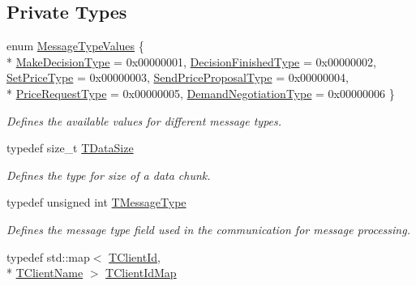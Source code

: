 \subsection*{Private Types}
\begin{DoxyCompactItemize}
\item 
enum \hyperlink{class_control_manager_a7b6de4a130e0de1729c7963edd972120}{Message\-Type\-Values} \{ \\*
\hyperlink{class_control_manager_a7b6de4a130e0de1729c7963edd972120afe62fd2d680bfeddc030a63944f8e513}{Make\-Decision\-Type} = 0x00000001, 
\hyperlink{class_control_manager_a7b6de4a130e0de1729c7963edd972120ae327aef118d20067ec6968987e76580d}{Decision\-Finished\-Type} = 0x00000002, 
\hyperlink{class_control_manager_a7b6de4a130e0de1729c7963edd972120ad0a806bbe260a48560eeeda4ffd855d6}{Set\-Price\-Type} = 0x00000003, 
\hyperlink{class_control_manager_a7b6de4a130e0de1729c7963edd972120ad493a309cdd6a23cc9e78a2e17eaf47d}{Send\-Price\-Proposal\-Type} = 0x00000004, 
\\*
\hyperlink{class_control_manager_a7b6de4a130e0de1729c7963edd972120afad3b5e04ece26c7ec3a5f388db53b43}{Price\-Request\-Type} = 0x00000005, 
\hyperlink{class_control_manager_a7b6de4a130e0de1729c7963edd972120a8adf22182deb49ea93b62097e2618cff}{Demand\-Negotiation\-Type} = 0x00000006
 \}
\begin{DoxyCompactList}\small\item\em Defines the available values for different message types. \end{DoxyCompactList}\item 
typedef size\-\_\-t \hyperlink{class_control_manager_a5c898e9e00806858a59700370560aea7}{T\-Data\-Size}
\begin{DoxyCompactList}\small\item\em Defines the type for size of a data chunk. \end{DoxyCompactList}\item 
typedef unsigned int \hyperlink{class_control_manager_a36b60e90749624a648dc225c2c136397}{T\-Message\-Type}
\begin{DoxyCompactList}\small\item\em Defines the message type field used in the communication for message processing. \end{DoxyCompactList}\item 
typedef std\-::map$<$ \hyperlink{class_control_manager_a1bff13cab35db39c43f81f49b56e4849}{T\-Client\-Id}, \\*
\hyperlink{class_control_manager_ae9c86c5286c9ebf222ea44b60c463872}{T\-Client\-Name} $>$ \hyperlink{class_control_manager_a5f6aa6ca619f6aa8dddfc3d5000162f0}{T\-Client\-Id\-Map}

\end{DoxyCompactItemize}

